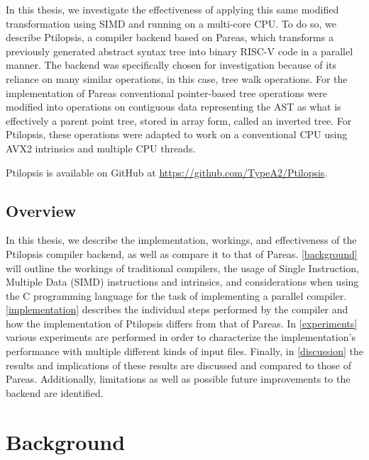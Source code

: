 \documentclass[11pt,dvipsnames]{article}
\newcommand{\Rplus}{\protect\hspace{-.1em}\protect\raisebox{.35ex}{\smaller{\smaller\textbf{+}}}}
\newcommand{\Cpp}{\mbox{C\Rplus\Rplus}\xspace}
\begin{document}
In this thesis, we investigate the effectiveness of applying this same modified transformation using SIMD and running on a multi-core CPU. To do so, we describe Ptilopsis, a compiler backend based on Pareas, which transforms a previously generated abstract syntax tree into binary RISC-V code in a parallel manner. The backend was specifically chosen for investigation because of its reliance on many similar operations, in this case, tree walk operations. For the implementation of Pareas conventional pointer-based tree operations were modified into operations on contiguous data representing the AST as what is effectively a parent point tree, stored in array form, called an inverted tree. For Ptilopsis, these operations were adapted to work on a conventional CPU using AVX2 intrinsics \cite{intrinsics} and multiple CPU threads.

Ptilopsis is available on GitHub at \url{https://github.com/TypeA2/Ptilopsis}.

\subsection{Overview}
In this thesis, we describe the implementation, workings, and effectiveness of the Ptilopsis compiler backend, as well as compare it to that of Pareas.
\autoref{background} will outline the workings of traditional compilers, the usage of Single Instruction, Multiple Data (SIMD) instructions and intrinsics, and considerations when using the \Cpp programming language for the task of implementing a parallel compiler.
\autoref{implementation} describes the individual steps performed by the compiler and how the implementation of Ptilopsis differs from that of Pareas.
In \autoref{experiments} various experiments are performed in order to characterize the implementation's performance with multiple different kinds of input files.
Finally, in \autoref{discussion} the results and implications of these results are discussed and compared to those of Pareas. Additionally, limitations as well as possible future improvements to the backend are identified.

\section{Background} \label{background}
\end{document}
